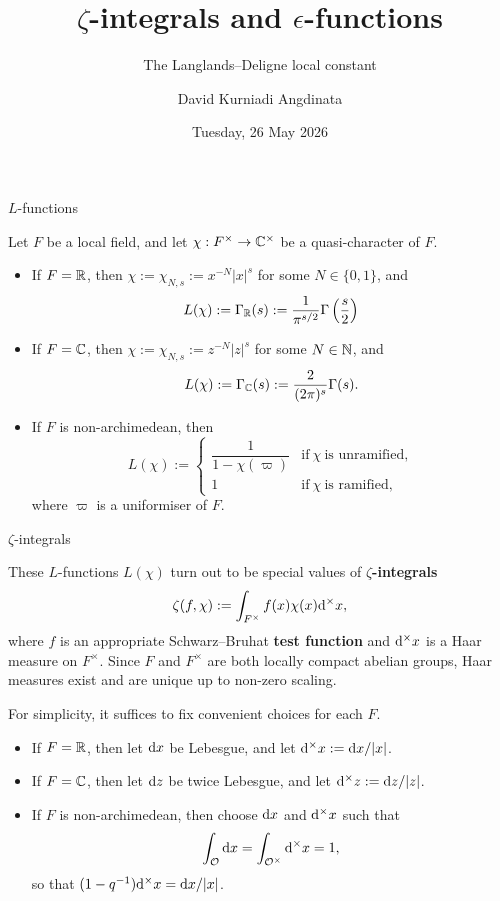 
\title{\texorpdfstring{$ \zeta $}{zeta}-integrals and \texorpdfstring{$ \epsilon $}{epsilon}-functions}
\subtitle{The Langlands--Deligne local constant}
\author{David Kurniadi Angdinata}
\date{Tuesday, 26 May 2026}



\frame\maketitle

\begin{frame}{$ L $-functions}

Let $ F $ be a local field, and let $ \chi : F^\times \to \mathbb{C}^\times $ be a quasi-character of $ F $.
\begin{itemize}
\item If $ F = \mathbb{R} $, then $ \chi := \chi_{N, s} := x^{-N}|x|^s $ for some $ N \in \{0, 1\} $, and
$$ L(\chi) := \Gamma_{\mathbb{R}}(s) := \dfrac{1}{\pi^{s / 2}}\Gamma\left(\dfrac{s}{2}\right) $$
\item If $ F = \mathbb{C} $, then $ \chi := \chi_{N, s} := z^{-N}|z|^s $ for some $ N \in \mathbb{N} $, and
$$ L(\chi) := \Gamma_{\mathbb{C}}(s) := \dfrac{2}{(2\pi)^s}\Gamma(s). $$
\item If $ F $ is non-archimedean, then
$$ L(\chi) :=
\begin{cases}
\dfrac{1}{1 - \chi(\varpi)} & \text{if} \ \chi \ \text{is unramified}, \\
1 & \text{if} \ \chi \ \text{is ramified},
\end{cases}
$$
where $ \varpi $ is a uniformiser of $ F $.
\end{itemize}
\end{frame}

\begin{frame}{$ \zeta $-integrals}

These $ L $-functions $ L(\chi) $ turn out to be special values of \textbf{$ \zeta $-integrals}
$$ \zeta(f, \chi) := \int_{F^\times} f(x)\chi(x)\mathrm{d}^\times x, $$
where $ f $ is an appropriate Schwarz--Bruhat \textbf{test function} and $ \mathrm{d}^\times x $ is a Haar measure on $ F^\times $. Since $ F $ and $ F^\times $ are both locally compact abelian groups, Haar measures exist and are unique up to non-zero scaling.

\bigskip For simplicity, it suffices to fix convenient choices for each $ F $.
\begin{itemize}
\item If $ F = \mathbb{R} $, then let $ \mathrm{d} x $ be Lebesgue, and let $ \mathrm{d}^\times x := \mathrm{d} x / |x| $.
\item If $ F = \mathbb{C} $, then let $ \mathrm{d} z $ be twice Lebesgue, and let $ \mathrm{d}^\times z := \mathrm{d} z / |z| $.
\item If $ F $ is non-archimedean, then choose $ \mathrm{d} x $ and $ \mathrm{d}^\times x $ such that
$$ \int_{\mathcal{O}} \mathrm{d} x = \int_{\mathcal{O}^\times} \mathrm{d}^\times x = 1, $$
so that $ (1 - q^{-1})\mathrm{d}^\times x = \mathrm{d} x / |x| $.
\end{itemize}

\end{frame}

